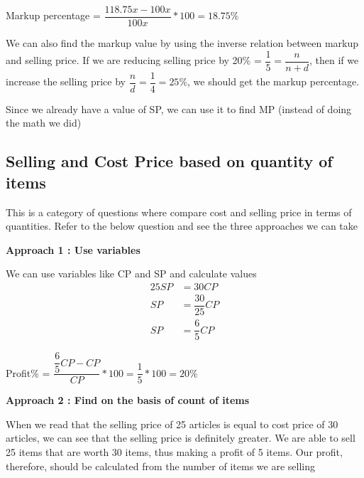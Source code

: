 Markup percentage = $\dfrac{118.75x - 100x}{100x} * 100 = 18.75\%$

\begin{EXTRA-LEARNING}
    We can also find the markup value by using the inverse relation between markup and selling price. If we are reducing selling price by 20\% = $\dfrac{1}{5} = \dfrac{n}{n+d}$, then if we increase the selling price by $\dfrac{n}{d} = \dfrac{1}{4} = 25\%$, we should get the markup percentage. 

    Since we already have a value of SP, we can use it to find MP (instead of doing the math we did)
\end{EXTRA-LEARNING}
\newpage

















\subsection{Selling and Cost Price based on quantity of items}
This is a category of questions where compare cost and selling price in terms of quantities. Refer to the below question and see the three approaches we can take


\textbf{Approach 1 : Use variables}

We can use variables like CP and SP and calculate values
\begin{align*}
    25 SP &= 30 CP \\
    SP &= \dfrac{30}{25} CP \\
    SP &= \dfrac{6}{5} CP
\end{align*}

Profit\% = $\dfrac{\dfrac{6}{5} CP - CP}{CP} * 100 = \dfrac{1}{5} * 100 = 20\%$

\textbf{Approach 2 : Find on the basis of count of items}

When we read that the selling price of 25 articles is equal to cost price of 30 articles, we can see that the selling price is definitely greater. We are able to sell 25 items that are worth 30 items, thus making a profit of 5 items. Our profit, therefore, should be calculated from the number of items we are selling

